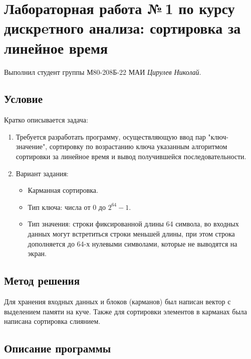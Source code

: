 \documentclass[12pt]{article}
\begin{document}
\section*{Лабораторная работа №\,1 по курсу дискрeтного анализа: сортировка за линейное время}

Выполнил студент группы М80-208Б-22 МАИ \textit{Цирулев Николай}.

\subsection*{Условие}

Кратко описывается задача:
\begin{enumerate}
\item
    Требуется разработать программу, осуществляющую ввод пар "ключ-значение", сортировку по возрастанию ключа указанным алгоритмом сортировки за линейное время и вывод получившейся последовательности.
\item
    Вариант задания:
        \begin{itemize}
            \item Карманная сортировка.
            \item Тип ключа: числа от 0 до $2^{64}-1$.
            \item Тип значения: строки фиксированной длины 64 символа, во входных данных могут встретиться строки меньшей длины, при этом строка дополняется до 64-х нулевыми символами, которые не выводятся на экран.
        \end{itemize}
\end{enumerate}

\subsection*{Метод решения}

Для хранения входных данных и блоков (карманов) был написан вектор с выделением памяти на куче. Также для сортировки элементов в карманах была написана сортировка слиянием.

\subsection*{Описание программы}
\end{document}
